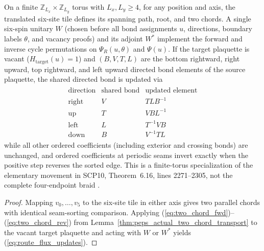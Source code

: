 \begin{lemma}
    \label{thm:peps_actual_route_flux_operation}
    \leanok
    On a finite $\mathbb{Z}_{L_x}\times\mathbb{Z}_{L_y}$ torus with $L_x,L_y\ge 4$, for any position and axis, the translated six-site tile defines its spanning path, root, and two chords.
    A single six-spin unitary $W$ (chosen before all bond assignments $u$, directions, boundary labels $\theta$, and vacancy proofs) and its adjoint $W^*$ implement the forward and inverse cycle permutations on $\Psi_R(u,\theta)$ and $\Psi(u)$.
    If the target plaquette is vacant ($H_{\mathrm{target}}(u)=1$) and $(B,V,T,L)$ are the bottom rightward, right upward, top rightward, and left upward directed bond elements of the source plaquette, the shared directed bond is updated via
    \begin{align}
        \begin{array}{ccc}
            \text{direction} & \text{shared bond} & \text{updated element} \\
            \text{right}     & V                  & T L B^{-1}             \\
            \text{up}        & T                  & V B L^{-1}             \\
            \text{left}      & L                  & T^{-1} V B             \\
            \text{down}      & B                  & V^{-1} T L
        \end{array}
        \label{eq:route_flux_updates}
    \end{align}
    while all other ordered coefficients (including exterior and crossing bonds) are unchanged, and ordered coefficients at periodic seams invert exactly when the positive step reverses the sorted edge.
    This is a finite-torus specialization of the elementary movement in SCP10, Theorem~6.16, lines 2271--2305, not the complete four-endpoint braid \cite{gap:rmp_peps_quantum_double_g_isometry}.
\end{lemma}
\begin{proof}\leanok
    Mapping $v_0,\ldots,v_5$ to the six-site tile in either axis gives two parallel chords with identical seam-sorting comparison.
    Applying (\ref{eq:two_chord_fwd})--(\ref{eq:two_chord_rev}) from Lemma~\ref{thm:peps_actual_two_chord_transport} to the vacant target plaquette and acting with $W$ or $W^*$ yields (\ref{eq:route_flux_updates}).
\end{proof}

